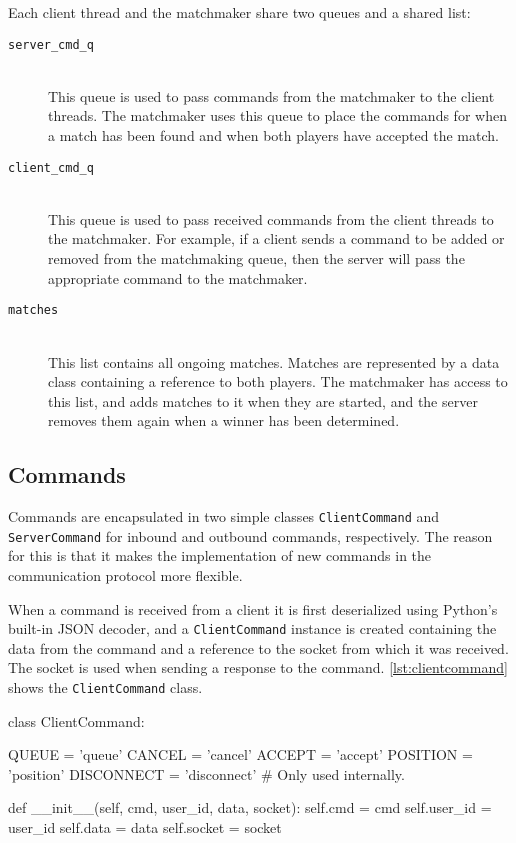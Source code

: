 Each client thread and the matchmaker share two queues and a shared list:

\begin{description}
	\item[\texttt{server\_cmd\_q}] \hfill \\
		This queue is used to pass commands from the matchmaker to the client threads.
		The matchmaker uses this queue to place the commands for when a match has been found and when both players have accepted the match.
	\item[\texttt{client\_cmd\_q}] \hfill \\
		This queue is used to pass received commands from the client threads to the matchmaker.
		For example, if a client sends a command to be added or removed from the matchmaking queue, then the server will pass the appropriate command to the matchmaker.
	\item[\texttt{matches}] \hfill \\
		This list contains all ongoing matches.
		Matches are represented by a data class containing a reference to both players.
		The matchmaker has access to this list, and adds matches to it when they are started, and the server removes them again when a winner has been determined.
\end{description}

\subsection{Commands}
Commands are encapsulated in two simple classes \texttt{Client\-Command} and \texttt{Server\-Command} for inbound and outbound commands, respectively.
The reason for this is that it makes the implementation of new commands in the communication protocol more flexible.

When a command is received from a client it is first deserialized using Python's built-in JSON decoder, and a \texttt{Client\-Command} instance is created containing the data from the command and a reference to the socket from which it was received.
The socket is used when sending a response to the command.
\autoref{lst:clientcommand} shows the \texttt{Client\-Command} class.

\begin{code}[language={Python}, caption={\texttt{ClientCommand} Class}, label={lst:clientcommand}]
class ClientCommand:

	QUEUE = 'queue'
	CANCEL = 'cancel'
	ACCEPT = 'accept'
	POSITION = 'position'
	DISCONNECT = 'disconnect' # Only used internally.

	def __init__(self, cmd, user_id, data, socket):
		self.cmd = cmd
		self.user_id = user_id
		self.data = data
		self.socket = socket
\end{code}

